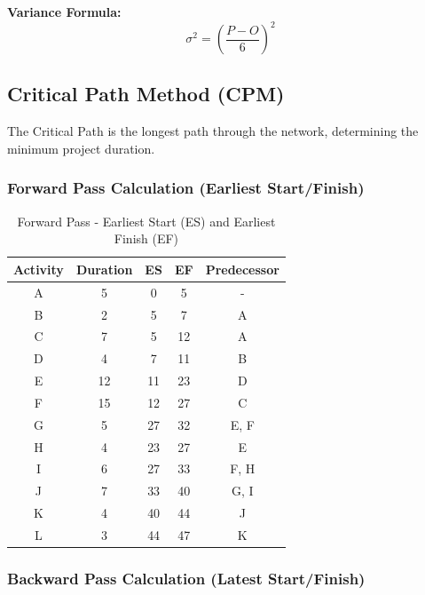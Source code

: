 \documentclass[12pt,a4paper]{article}
\begin{document}
\textbf{Variance Formula:}
\begin{equation}
\sigma^2 = \left(\frac{P - O}{6}\right)^2
\end{equation}

\subsection{Critical Path Method (CPM)}

The Critical Path is the longest path through the network, determining the minimum project duration.

\subsubsection{Forward Pass Calculation (Earliest Start/Finish)}

\begin{table}[H]
\centering
\begin{tabular}{|c|c|c|c|c|}
\hline
\textbf{Activity} & \textbf{Duration} & \textbf{ES} & \textbf{EF} & \textbf{Predecessor} \\
\hline
A & 5 & 0 & 5 & - \\
\hline
B & 2 & 5 & 7 & A \\
\hline
C & 7 & 5 & 12 & A \\
\hline
D & 4 & 7 & 11 & B \\
\hline
E & 12 & 11 & 23 & D \\
\hline
F & 15 & 12 & 27 & C \\
\hline
G & 5 & 27 & 32 & E, F \\
\hline
H & 4 & 23 & 27 & E \\
\hline
I & 6 & 27 & 33 & F, H \\
\hline
J & 7 & 33 & 40 & G, I \\
\hline
K & 4 & 40 & 44 & J \\
\hline
L & 3 & 44 & 47 & K \\
\hline
\end{tabular}
\caption{Forward Pass - Earliest Start (ES) and Earliest Finish (EF)}
\end{table}

\subsubsection{Backward Pass Calculation (Latest Start/Finish)}
\end{document}
